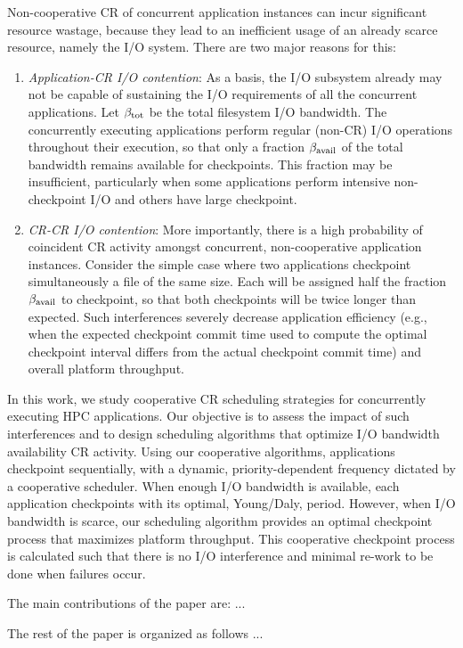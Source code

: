 Non-cooperative CR of concurrent application instances can incur significant resource
wastage, because they lead to an inefficient usage of an already scarce resource,
namely the I/O system.  There are two major reasons for this:
\begin{enumerate}
\item \emph{Application-CR I/O contention}: As a basis, the I/O subsystem already may
  not be capable of sustaining the I/O requirements of all the concurrent
  applications.  Let $\beta_{\text{tot}}$ be the total filesystem I/O bandwidth.  The
  concurrently executing applications perform regular (non-CR) I/O operations
  throughout their execution, so that only a fraction $\beta_{\text{avail}}$ of the total
  bandwidth remains available for checkpoints.  This fraction may be insufficient,
  particularly when some applications perform intensive non-checkpoint I/O and others
  have large checkpoint.

\item \emph{CR-CR I/O contention}: More importantly, there is a high probability of
  coincident CR activity amongst concurrent, non-cooperative application instances.
  Consider the simple case where two applications checkpoint simultaneously a file of
  the same size. Each will be assigned half the fraction $\beta_{\text{avail}}$ to checkpoint,
  so that both checkpoints will be twice longer than expected. Such interferences
  severely decrease application efficiency (e.g., when the expected checkpoint commit
  time used to compute the optimal checkpoint interval differs from the actual
  checkpoint commit time) and overall platform throughput.
\end{enumerate}

In this work, we study cooperative CR scheduling strategies for concurrently
executing HPC applications.  Our objective is to assess the impact of such
interferences and to design scheduling algorithms that optimize I/O bandwidth
availability CR activity.  Using our cooperative algorithms, applications checkpoint
sequentially, with a dynamic, priority-dependent frequency dictated by a cooperative
scheduler.  When enough I/O bandwidth is available, each application checkpoints with
its optimal, Young/Daly, period. However, when I/O bandwidth is scarce, our
scheduling algorithm provides an optimal checkpoint process that maximizes platform
throughput. This cooperative checkpoint process is calculated such that there is no
I/O interference and minimal re-work to be done when failures occur.

The main contributions of the paper are: ...

The rest of the paper is organized as follows ...
